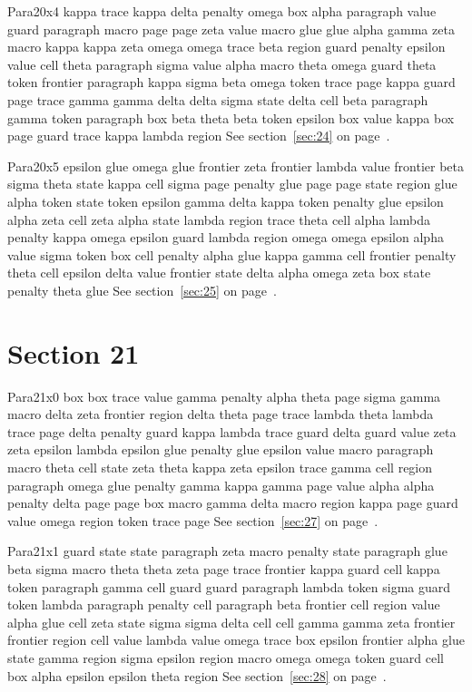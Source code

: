 \documentclass{article}
\begin{document}
Para20x4 kappa trace kappa delta penalty omega box alpha paragraph value guard paragraph macro page page zeta value macro glue glue alpha gamma zeta macro kappa kappa zeta omega omega trace beta region guard penalty epsilon value cell theta paragraph sigma value alpha macro theta omega guard theta token frontier paragraph kappa sigma beta omega token trace page kappa guard page trace gamma gamma delta delta sigma state delta cell beta paragraph gamma token paragraph box beta theta beta token epsilon box value kappa box page guard trace kappa lambda region See section~\ref{sec:24} on page~\pageref{sec:24}.

Para20x5 epsilon glue omega glue frontier zeta frontier lambda value frontier beta sigma theta state kappa cell sigma page penalty glue page page state region glue alpha token state token epsilon gamma delta kappa token penalty glue epsilon alpha zeta cell zeta alpha state lambda region trace theta cell alpha lambda penalty kappa omega epsilon guard lambda region omega omega epsilon alpha value sigma token box cell penalty alpha glue kappa gamma cell frontier penalty theta cell epsilon delta value frontier state delta alpha omega zeta box state penalty theta glue See section~\ref{sec:25} on page~\pageref{sec:25}.

\section{Section 21}\label{sec:21}
Para21x0 box box trace value gamma penalty alpha theta page sigma gamma macro delta zeta frontier region delta theta page trace lambda theta lambda trace page delta penalty guard kappa lambda trace guard delta guard value zeta zeta epsilon lambda epsilon glue penalty glue epsilon value macro paragraph macro theta cell state zeta theta kappa zeta epsilon trace gamma cell region paragraph omega glue penalty gamma kappa gamma page value alpha alpha penalty delta page page box macro gamma delta macro region kappa page guard value omega region token trace page See section~\ref{sec:27} on page~\pageref{sec:23}.

Para21x1 guard state state paragraph zeta macro penalty state paragraph glue beta sigma macro theta theta zeta page trace frontier kappa guard cell kappa token paragraph gamma cell guard guard paragraph lambda token sigma guard token lambda paragraph penalty cell paragraph beta frontier cell region value alpha glue cell zeta state sigma sigma delta cell cell gamma gamma zeta frontier frontier region cell value lambda value omega trace box epsilon frontier alpha glue state gamma region sigma epsilon region macro omega omega token guard cell box alpha epsilon epsilon theta region See section~\ref{sec:28} on page~\pageref{sec:24}.
\end{document}
